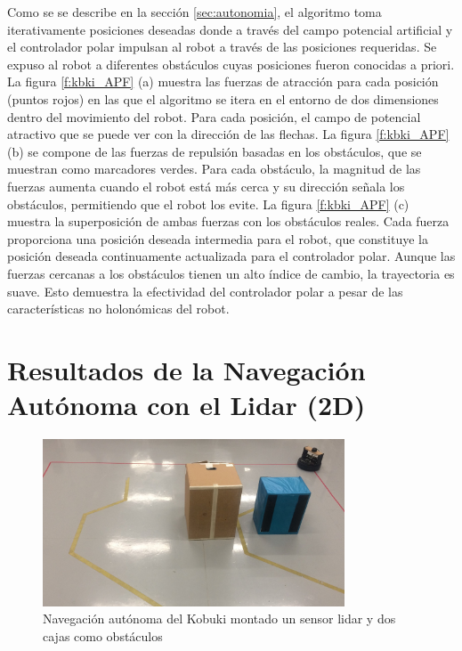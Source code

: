 Como se se describe en la sección \ref{sec:autonomia}, el algoritmo toma iterativamente 
posiciones deseadas  donde a través del campo potencial artificial y el controlador 
polar impulsan al robot a través de las posiciones requeridas. Se expuso al robot 
a diferentes obstáculos cuyas posiciones fueron conocidas a priori. La figura 
\ref{f:kbki_APF} (a) muestra las fuerzas de atracción para cada posición (puntos rojos) en 
las que el algoritmo se itera en el entorno de dos dimensiones dentro del movimiento del 
robot. Para cada posición, el campo de potencial atractivo que se puede ver con la dirección 
de las flechas. La figura \ref{f:kbki_APF} (b) se compone de las fuerzas de repulsión basadas en 
los obstáculos, que se muestran como marcadores verdes. Para cada obstáculo, la magnitud de 
las fuerzas aumenta cuando el robot está más cerca y su dirección señala los obstáculos, permitiendo 
que el robot los evite. La figura \ref{f:kbki_APF} (c) muestra la superposición de ambas fuerzas 
con los obstáculos reales. Cada fuerza proporciona una posición deseada intermedia para el 
robot, que constituye la posición deseada continuamente actualizada para el controlador 
polar. Aunque las fuerzas cercanas a los obstáculos tienen un alto índice de cambio, la 
trayectoria es suave. Esto demuestra la efectividad del controlador polar a pesar de las 
características no holonómicas del robot.

\section{Resultados de la Navegación Autónoma con el Lidar (2D)}
\begin{figure}%
  \centering \footnotesize
  \includegraphics[width=0.80\textwidth]{images/kobuki_201.jpg}
  \captionsetup{font=footnotesize}
  \caption{Navegación autónoma del Kobuki montado un sensor lidar y dos cajas
  como obstáculos}
\end{figure}


